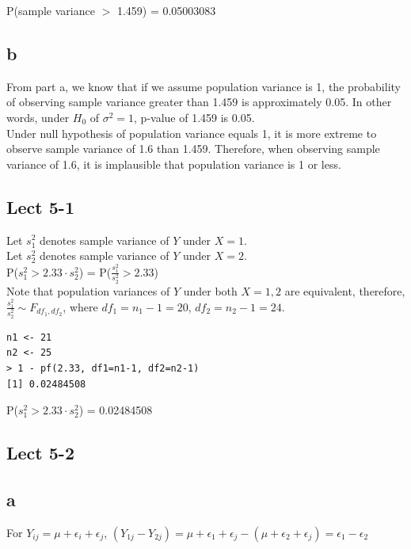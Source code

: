 \documentclass[11pt,letterpaper]{article}
\begin{document}
\noindent P(sample variance $>$ 1.459) = 0.05003083

\subsection*{b}
From part a, we know that if we assume population variance is 1, the probability of observing sample variance greater than 1.459 is approximately 0.05. In other words, under $H_0$ of $\sigma^2 = 1$, p-value of 1.459 is 0.05.\\

\noindent Under null hypothesis of population variance equals 1, it is more extreme to observe sample variance of 1.6 than 1.459. Therefore, when observing sample variance of 1.6, it is implausible that population variance is 1 or less. 

\subsection*{Lect 5-1}
Let $s_1^2$ denotes sample variance of $Y$ under $X=1$.\\

\noindent Let $s_2^2$ denotes sample variance of $Y$ under $X=2$.\\

\noindent P($s_1^2 > 2.33 \cdot s_2^2$) = P($\frac{s_1^2}{s_2^2} > 2.33$) \\

\noindent Note that population variances of $Y$ under both $X=1,2$ are equivalent, therefore, $\frac{s_1^2}{s_2^2} \sim F_{df_1, df_2}$, where $df_1 = n_1-1 = 20$, $df_2 = n_2 - 1 = 24$.

\begin{verbatim}
n1 <- 21
n2 <- 25
> 1 - pf(2.33, df1=n1-1, df2=n2-1)
[1] 0.02484508
\end{verbatim}

\noindent P($s_1^2 > 2.33 \cdot s_2^2$) = 0.02484508

\subsection*{Lect 5-2}
\subsection*{a}
For $Y_{ij} = \mu + \epsilon_i + \epsilon_j$, $(Y_{1j} - Y_{2j}) = \mu + \epsilon_1 + \epsilon_j - (\mu + \epsilon_2 + \epsilon_j) = \epsilon_1 - \epsilon_2$ \\
\end{document}
